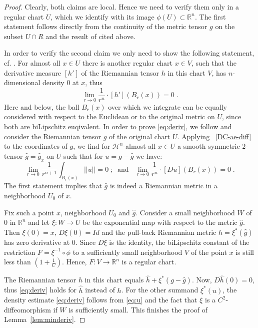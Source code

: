 \documentclass[12pt,leqno]{amsart}
\numberwithin{equation}{section}
\theoremstyle{definition}
\theoremstyle{remark}
\newcommand{\lref}[1]{Lemma~\ref{#1}}
\newcommand{\R}{\mathbb{R}}
\begin{document}
\begin{proof}
Clearly, both claims are local. Hence we need to verify them only in a regular chart $U$, which we identify with its image $\phi (U) \subset \R^n$.   The first statement
follows directly from the continuity of the metric tensor $g$ on the subset $U\cap R$ and the result of \cite{Goffmann}
cited above.

 In order to verify the second claim we only need to show the following statement, cf. \cite[Section 1.6]{Evans}.   For almost all $x\in U$ there is another
 regular chart $x\in V$, such that the derivative measure $[h']$ of  the Riemannian tensor $h$ in this  chart $V$, has $n$-dimensional density $0$
 at $x$, thus
 \begin{equation} \label{eq:deriv}
 \lim _{r\to 0}  \frac 1 {r^n} \cdot  {[h'] (B_r (x))}  =0 \;.
 \end{equation}
 Here and below, the ball $B_r (x)$ over which we integrate can be equally considered with respect to the Euclidean or to the original metric on $U$, since both are biLipschitz euqivalent.
 In order to prove \eqref{eq:deriv},   we follow \cite[Section 4.2]{Per-DC} and consider the Riemannian tensor $g$ of the original chart $U$.  Applying  ~\eqref{DC-ae-diff}  to  the coordinates of $g$, we find for $\mathcal H^n$-almost all
 $x\in U$  a  smooth symmetric $2$-tensor  $\hat g =\hat g_x$ on  $U$ such that  for
 $u=g-\hat g$  we have:
 \begin{equation} \label{eq:u}
 \lim_{r\to 0}\frac 1 {r^{n+1}}  \int _{B_r(x)} ||u|| =0 \; ;\; \;  \text{and} \;  \; \;
  \lim _{r\to 0}  \frac 1 {r^n} \cdot   [Du] (B_r (x)) =0 \; .
  \end{equation}
The first statement implies that $\hat g$ is indeed a Riemannian metric in a neighborhood $U_0$ of $x$.


Fix such a point $x$,  neighborhood $U_0$ and $\hat g$.
Consider a small neighborhood $W$ of $0$ in $\R^n$ and let $\xi :W\to U$ be the exponential map with respect to the metric
$\hat g$. Then $\xi (0)=x$, $D\xi  (0) =Id$  and  the  pull-back Riemannian metric $\hat h= \xi^{\ast}  (\hat g)$  has zero derivative at $0$.    Since $D\xi$ is the identity, the biLipschitz constant of the restriction $F=\xi ^{-1} \circ \phi$ to a sufficiently
small neighborhood $V$ of the point $x$ is still less than $(1 + \frac 1 C)$.      Hence, $F:V\to \R^n$ is a regular chart.

The Riemannian tensor $h$ in this chart equals $\hat h  +\xi^{\ast } (g-\hat g)$.
Now, $D\hat h (0) =0$, thus
\eqref{eq:deriv} holds for $\hat h$ instead of $h$.  For the other summand  $\xi ^{\ast} (u)$, the density estimate
\eqref{eq:deriv} follows from \eqref{eq:u} and  the fact that $\xi$ is a $C^2$-diffeomorphism
 if $W$ is sufficiently small.   This finishes the proof of \lref{lem:minderiv}.
\end{proof}
\end{document}
